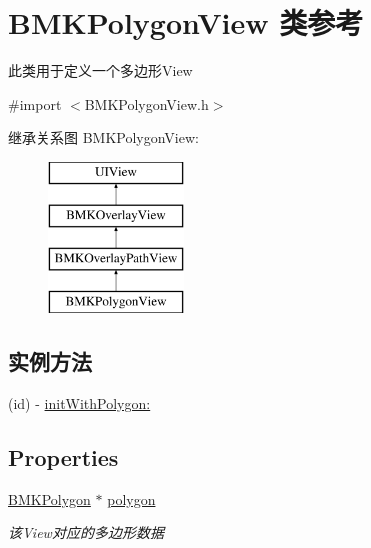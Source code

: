 \hypertarget{interface_b_m_k_polygon_view}{\section{B\-M\-K\-Polygon\-View 类参考}
\label{interface_b_m_k_polygon_view}
}


此类用于定义一个多边形\-View  




{\ttfamily \#import $<$B\-M\-K\-Polygon\-View.\-h$>$}

继承关系图 B\-M\-K\-Polygon\-View\-:\begin{figure}[H]
\begin{center}
\leavevmode
\includegraphics[height=4.000000cm]{interface_b_m_k_polygon_view}
\end{center}
\end{figure}
\subsection*{实例方法}
\begin{DoxyCompactItemize}
\item 
(id) -\/ \hyperlink{interface_b_m_k_polygon_view_a447c40c6fd5c04668d7b9da823a5af26}{init\-With\-Polygon\-:}
\end{DoxyCompactItemize}
\subsection*{Properties}
\begin{DoxyCompactItemize}
\item 
\hypertarget{interface_b_m_k_polygon_view_afcb56ec12abe7a03236d732f63f555bd}{\hyperlink{interface_b_m_k_polygon}{B\-M\-K\-Polygon} $\ast$ \hyperlink{interface_b_m_k_polygon_view_afcb56ec12abe7a03236d732f63f555bd}{polygon}}\label{interface_b_m_k_polygon_view_afcb56ec12abe7a03236d732f63f555bd}

\begin{DoxyCompactList}\small\item\em 该\-View对应的多边形数据 \end{DoxyCompactList}\end{DoxyCompactItemize}
